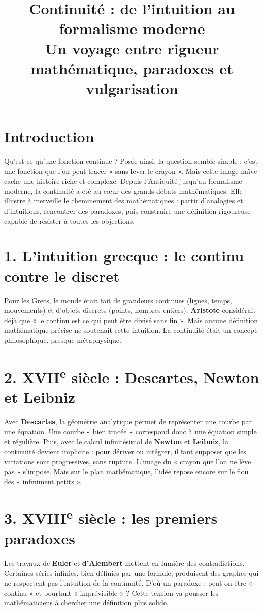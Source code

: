 \documentclass[12pt, a4paper]{article}
\title{
    \Huge\textbf{Continuité : de l’intuition au formalisme moderne}\\[0.4cm]
    \large Un voyage entre rigueur mathématique, paradoxes et vulgarisation
}
\author{} %
\date{}   %
\begin{document}
\maketitle
\thispagestyle{empty}

\section*{Introduction}
Qu’est-ce qu’une fonction continue ? Posée ainsi, la question semble simple : c’est une fonction que l’on peut tracer « sans lever le crayon ». Mais cette image naïve cache une histoire riche et complexe. Depuis l’Antiquité jusqu’au formalisme moderne, la continuité a été au cœur des grands débats mathématiques. Elle illustre à merveille le cheminement des mathématiques : partir d’analogies et d’intuitions, rencontrer des paradoxes, puis construire une définition rigoureuse capable de résister à toutes les objections.

\section*{1. L’intuition grecque : le continu contre le discret}
Pour les Grecs, le monde était fait de grandeurs continues (lignes, temps, mouvements) et d’objets discrets (points, nombres entiers). \textbf{Aristote} considérait déjà que « le continu est ce qui peut être divisé sans fin ». Mais aucune définition mathématique précise ne soutenait cette intuition. La continuité était un concept philosophique, presque métaphysique.

\section*{2. XVII\textsuperscript{e} siècle : Descartes, Newton et Leibniz}
Avec \textbf{Descartes}, la géométrie analytique permet de représenter une courbe par une équation. Une courbe « bien tracée » correspond donc à une équation simple et régulière. Puis, avec le calcul infinitésimal de \textbf{Newton} et \textbf{Leibniz}, la continuité devient implicite : pour dériver ou intégrer, il faut supposer que les variations sont progressives, sans rupture. L’image du « crayon que l’on ne lève pas » s’impose. Mais sur le plan mathématique, l’idée repose encore sur le flou des « infiniment petits ».

\section*{3. XVIII\textsuperscript{e} siècle : les premiers paradoxes}
Les travaux de \textbf{Euler} et \textbf{d’Alembert} mettent en lumière des contradictions. Certaines séries infinies, bien définies par une formule, produisent des graphes qui ne respectent pas l’intuition de la continuité. D’où un paradoxe : peut-on être « continu » et pourtant « imprévisible » ? Cette tension va pousser les mathématiciens à chercher une définition plus solide.
\end{document}
